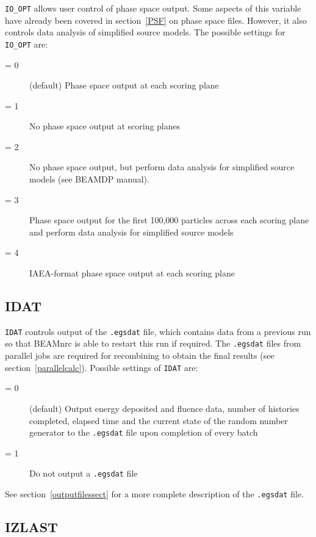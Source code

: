 \documentclass[12pt,twoside]{article}
\begin{document}
\verb+IO_OPT+ allows user control of phase space output.  Some aspects of
this variable have already been covered in section~\ref{PSF} on phase space
files.  However, it also controls data analysis of simplified source
models.  The possible settings for
\verb+IO_OPT+ are:
\begin{description}
\item [= 0] (default) Phase space output at each scoring plane
\item [= 1] No phase space output at scoring planes
\item [= 2] No phase space output, but perform data analysis for
simplified source models (see BEAMDP manual).
\item [= 3] Phase space output for the first 100,000 particles across
each scoring plane and perform data analysis for simplified source
models
\item [= 4] IAEA-format phase space output at each scoring plane
\end{description}

\subsection{IDAT}
\label{IDAT}

\verb+IDAT+ controls output of the \verb+.egsdat+ file, which contains data
from a previous run so that BEAMnrc is able to restart this run
if required.  The {\tt .egsdat} files from parallel jobs are
required for recombining to obtain the final results (see section~\ref{parallelcalc}).
Possible settings of \verb+IDAT+ are:

\begin{description}
\item [= 0] (default) Output energy deposited and fluence data,
number of histories completed, elapsed time and the current state of
the random number generator to the
{\tt .egsdat} file upon completion of every batch
\item [= 1] Do not output a {\tt .egsdat} file
\end{description}

See section~\ref{outputfilessect} for a more complete description of
the {\tt .egsdat} file.

\subsection{IZLAST}
\label{IZLAST}
\end{document}
